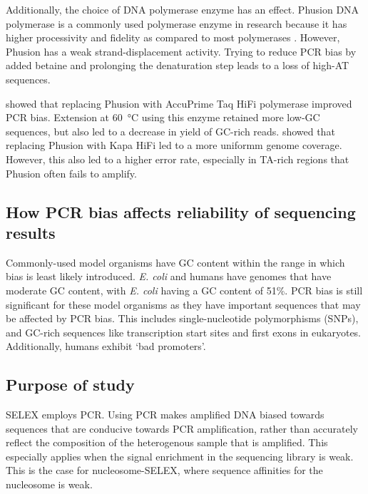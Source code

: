 \documentclass[parskip=full, numbers=noenddot]{scrreprt}
\begin{document}
Additionally, the choice of DNA polymerase enzyme has an effect.  Phusion DNA polymerase is a commonly used polymerase enzyme in research because it has higher processivity and fidelity as compared to most polymerases \citep{quail_optimal_2012}.  However, Phusion has a weak strand-displacement activity.  Trying to reduce PCR bias by added betaine and prolonging the denaturation step leads to a loss of high-AT sequences.

\citet{aird_analyzing_2011} showed that replacing Phusion with AccuPrime Taq HiFi polymerase improved PCR bias.  Extension at \SI{60}{\celsius} using this enzyme retained more low-GC sequences, but also led to a decrease in yield of GC-rich reads.  \citet{quail_optimal_2012} showed that replacing Phusion with Kapa HiFi led to a more uniformm genome coverage.  However, this also led to a higher error rate, especially in TA-rich regions that Phusion often fails to amplify.

\subsection{How PCR bias affects reliability of sequencing results}
\label{ssec:pcrbias_intro_effects}

Commonly-used model organisms have GC content within the range in which bias is least likely introduced.  \emph{E. coli} and humans have genomes that have moderate GC content, with \emph{E. coli} having a GC content of 51\%.  PCR bias is still significant for these model organisms as they have important sequences that may be affected by PCR bias.  This includes single-nucleotide polymorphisms (SNPs), and GC-rich sequences like transcription start sites and first exons in eukaryotes.  Additionally, humans exhibit `bad promoters'. %

\subsection{Purpose of study}
\label{ssec:pcrbias_intro_why}

SELEX employs PCR.  Using PCR makes amplified DNA biased towards sequences that are conducive towards PCR amplification, rather than accurately reflect the composition of the heterogenous sample that is amplified. %
This especially applies when the signal enrichment in the sequencing library is weak.  This is the case for nucleosome-SELEX, where sequence affinities for the nucleosome is weak.
\end{document}
